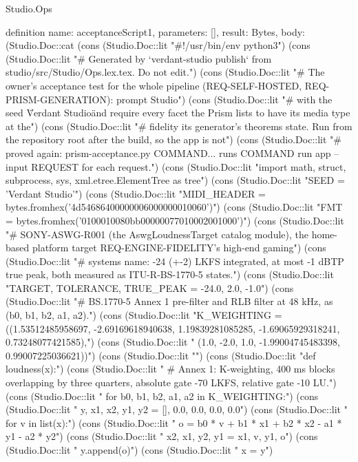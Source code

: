 \begin{lexlean}{Studio.Ops}
\begin{semanticmodule}
{definition{
  name: acceptanceScript1,
  parameters: [],
  result: Bytes,
  body: (Studio.Doc::cat
    (cons (Studio.Doc::lit "#!/usr/bin/env python3\n")
    (cons (Studio.Doc::lit "# Generated by `verdant-studio publish` from studio/src/Studio/Ops.lex.tex. Do not edit.\n")
    (cons (Studio.Doc::lit "# The owner's acceptance test for the whole pipeline (REQ-SELF-HOSTED, REQ-PRISM-GENERATION): prompt Studio\n")
    (cons (Studio.Doc::lit "# with the seed \"Verdant Studio\" and require every facet the Prism lists to have its media type at the\n")
    (cons (Studio.Doc::lit "# fidelity its generator's theorems state. Run from the repository root after the build, so the app is not\n")
    (cons (Studio.Doc::lit "# proved again: prism-acceptance.py COMMAND... runs COMMAND run app --input REQUEST for each request.\n")
    (cons (Studio.Doc::lit "import math, struct, subprocess, sys, xml.etree.ElementTree as tree\n")
    (cons (Studio.Doc::lit "SEED = 'Verdant Studio'\n")
    (cons (Studio.Doc::lit "MIDI_HEADER = bytes.fromhex('4d54686400000006000000010060')\n")
    (cons (Studio.Doc::lit "FMT = bytes.fromhex('0100010080bb00000077010002001000')\n")
    (cons (Studio.Doc::lit "# SONY-ASWG-R001 (the AswgLoudnessTarget catalog module), the home-based platform target REQ-ENGINE-FIDELITY's high-end gaming\n")
    (cons (Studio.Doc::lit "# systems name: -24 (+-2) LKFS integrated, at most -1 dBTP true peak, both measured as ITU-R-BS-1770-5 states.\n")
    (cons (Studio.Doc::lit "TARGET, TOLERANCE, TRUE_PEAK = -24.0, 2.0, -1.0\n")
    (cons (Studio.Doc::lit "# BS.1770-5 Annex 1 pre-filter and RLB filter at 48 kHz, as (b0, b1, b2, a1, a2).\n")
    (cons (Studio.Doc::lit "K_WEIGHTING = ((1.53512485958697, -2.69169618940638, 1.19839281085285, -1.69065929318241, 0.73248077421585),\n")
    (cons (Studio.Doc::lit "               (1.0, -2.0, 1.0, -1.99004745483398, 0.99007225036621))\n")
    (cons (Studio.Doc::lit "\n")
    (cons (Studio.Doc::lit "def loudness(x):\n")
    (cons (Studio.Doc::lit "    # Annex 1: K-weighting, 400 ms blocks overlapping by three quarters, absolute gate -70 LKFS, relative gate -10 LU.\n")
    (cons (Studio.Doc::lit "    for b0, b1, b2, a1, a2 in K_WEIGHTING:\n")
    (cons (Studio.Doc::lit "        y, x1, x2, y1, y2 = [], 0.0, 0.0, 0.0, 0.0\n")
    (cons (Studio.Doc::lit "        for v in list(x):\n")
    (cons (Studio.Doc::lit "            o = b0 * v + b1 * x1 + b2 * x2 - a1 * y1 - a2 * y2\n")
    (cons (Studio.Doc::lit "            x2, x1, y2, y1 = x1, v, y1, o\n")
    (cons (Studio.Doc::lit "            y.append(o)\n")
    (cons (Studio.Doc::lit "        x = y\n")
}}
\end{semanticmodule}
\end{lexlean}
